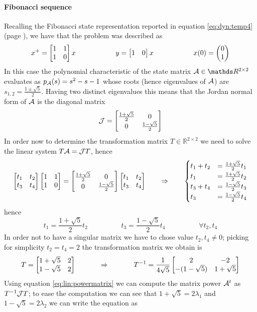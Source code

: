 		\paragraph{Fibonacci sequence} Recalling the Fibonacci state representation reported in equation \ref{eq:dyn:temp4} (page \pageref{eq:dyn:temp4}), we have that the problem was described as
		\[ x^+ = \begin{bmatrix} 1 & 1 \\ 1 & 0 \end{bmatrix} x \hspace{2cm} y = \begin{bmatrix} 1 & 0 \end{bmatrix} x \hspace{2cm} x(0) = \begin{pmatrix} 0 \\ 1 \end{pmatrix} \]
		In this case the polynomial characteristic of the state matrix $\A \in \mathds R^{2\times 2}$ evaluates as $p_{\mathcal{A}}(s) = s^2-s-1$ whose roots (hence eigenvalues of $\mathcal{A}$) are $s_{1,2} = \frac{1\pm \sqrt 5}{2}$. Having two distinct eigenvalues this means that the Jordan normal form of $\mathcal{A}$ is the diagonal matrix
		\[ \mathcal{J}= \begin{bmatrix} \frac{1+\sqrt 5}{2} & 0 \\ 0 & \frac{1-\sqrt 5}{2} \end{bmatrix} \]
		In order now to determine the transformation matrix $T \in \mathds R^{2\times 2}$ we need to solve the linear system $T\mathcal{A} = \mathcal{J} T$, hence
		\[ \begin{bmatrix} t_1 & t_2 \\ t_3 & t_4 \end{bmatrix} \begin{bmatrix} 1 & 1 \\ 1 & 0 \end{bmatrix} = \begin{bmatrix} \frac{1+\sqrt 5}{2} & 0 \\ 0 & \frac{1-\sqrt 5}{2} \end{bmatrix} \begin{bmatrix} t_1 & t_2 \\ t_3 & t_4 \end{bmatrix} \qquad \Rightarrow \qquad \begin{cases}
			t_1 + t_2  & = \frac{1+\sqrt 5}{2} t_1 \\
			t_1  & = \frac{1+\sqrt 5}{2} t_2 \\
			t_3 + t_4 & = \frac{1-\sqrt 5}{2} t_3 \\
			t_3 & =  \frac{1-\sqrt 5}{2 } t_4
		\end{cases}   \]
		hence
		\[ t_1 = \frac{1+\sqrt 5}{2}t_2 \hspace{2cm} t_3 = \frac{1-\sqrt 5}{2} t_4 \hspace{2cm} \forall t_2,t_4 \]
		In order not to have a singular matrix we have to chose value $t_2,t_4 \neq 0$; picking for simplicity $t_2 = t_4 = 2$ the transformation matrix we obtain is
		\[ T = \begin{bmatrix}  1 + \sqrt 5 & 2 \\ 1- \sqrt 5 & 2  \end{bmatrix} \hspace{1.2cm} \Rightarrow \hspace{1.2cm} T^{-1} = \frac{1}{4\sqrt 5} \begin{bmatrix}  2 & - 2 \\ - (1-\sqrt 5) & 1 + \sqrt 5  \end{bmatrix} \]
		Using equation \ref{eq:lin:powermatrix} we can compute the matrix power $\mathcal{A}^t$ as $T^{-1} \mathcal{J} T$; to ease the computation we can see that $1+\sqrt 5 = 2 \lambda_1$ and $1-\sqrt 5 = 2 \lambda_2$ we can write the equation as
